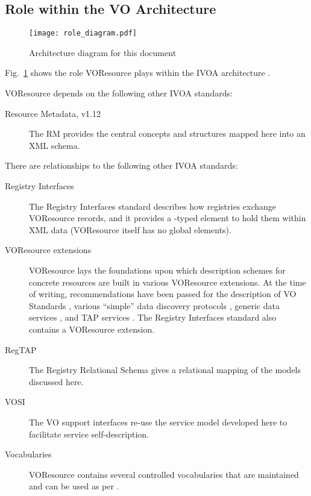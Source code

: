 \documentclass[11pt,a4paper]{ivoa}
\begin{document}
\subsection{Role within the VO Architecture}
\label{sect:role}

\begin{figure}
\centering

\texttt{[image: role\_diagram.pdf]}
\caption{Architecture diagram for this document}
\label{fig:archdiag}
\end{figure}

Fig.~\ref{fig:archdiag} shows the role VOResource plays within the
IVOA architecture \citep{2021ivoa.spec.1101D}.

VOResource depends on the following other IVOA standards:

\begin{description}
\item[Resource Metadata, v1.12] The RM \citep{2007ivoa.spec.0302H}
provides the central concepts and structures mapped here into an XML
schema.
\end{description}

There are relationships to the following other IVOA standards:

\begin{description}
\item[Registry Interfaces] The Registry
Interfaces \citep{2018ivoa.spec.0723D} standard
describes how registries exchange VOResource records, and it
provides a -typed element to hold them within XML
data (VOResource itself has no global elements).
\item[VOResource extensions] VOResource lays the foundations upon which
description schemes for concrete resources are built in various
VOResource extensions.  At the time of writing, recommendations have
been passed for the description of VO Standards
\citep{2012ivoa.spec.0508H}, various ``simple'' data discovery protocols
\citep{2017ivoa.spec.0530P}, generic data services
\citep{2021ivoa.spec.1102D}, and TAP services
\citep{2012ivoa.spec.0827D}.  The Registry Interfaces standard also
contains a VOResource extension.
\item[RegTAP] The Registry Relational Schema \citep{2019ivoa.spec.1011D}
gives a relational mapping of the models discussed here.
\item[VOSI] The VO support interfaces \citep{2017ivoa.spec.0524G} re-use
the service model developed here to facilitate service self-description.
\item[Vocabularies] VOResource contains several controlled vocabularies
that are maintained and can be used as per \citet{2023ivoa.spec.0206D}.
\end{description}
\end{document}
